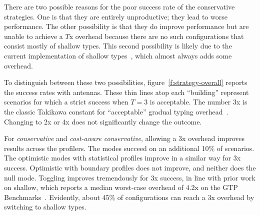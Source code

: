 There are two possible reasons for the poor success rate of the conservative
strategies.
One is that they are entirely unproductive; they lead to worse performance.
The other possibility is that they do improve performance but are unable
to achieve a $T$x overhead because there are no such configurations that
consist mostly of shallow types.
This second possibility is likely due to the current implementation of shallow
types~\cite{g-deep-shallow}, which almost always adds some overhead.

To distinguish between these two possibilities, figure~\ref{f:strategy-overall}
reports the success rates with antennas. These thin lines atop each ``building''
represent scenarios for which a strict success when $T = 3$ is acceptable.  The
number 3x is the classic Takikawa constant for ``acceptable'' gradual typing
overhead~\cite{vss-popl-2017,bbst-oopsla-2017}.  Changing to 2x or 4x does not
significantly change the outcome.

For \emph{conservative} and \emph{cost-aware conservative}, allowing a 3x
overhead improves results across the profilers. The modes succeed on an
additional 10\% of scenarios.  The optimistic modes with statistical profiles
improve in a similar way for 3x success.  Optimistic with boundary profiles does
not improve, and neither does the null mode.  Toggling
improves tremendously for 3x success, in line with prior work on shallow, which
reports a median worst-case overhead of 4.2x on the GTP
Benchmarks~\cite{g-deep-shallow}.  Evidently, about 45\% of configurations can
reach a 3x overhead by switching to shallow types.


